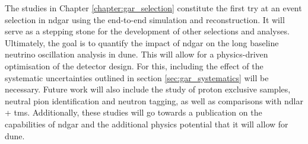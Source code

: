 \begin{comment}
Finally, in Chapter \ref{chapter:gar_selection} I apply to the event selection in \gls{ndgar}. I start by describing a method for selecting $\nu_{\mu}$ \gls{cc} events in section \ref{sec:gar_numu_cc}. This is mainly based on the muon score derived from the muon/pion classification I developed. Additionally, I perform an optimisation of the FV. As part of this study, I also examined the kinematics of the selected primary muon and the reconstructed interaction vertex. Next, in section \ref{sec:gar_charged_pions} I explore the capabilities of \gls{ndgar} and its reconstruction at identifying charged pions. I optimise a selection based on the reconstructed charged pion multiplicity, for events with 0, 1, 2, and $\geq 3 \pi^{\pm}$ in the final state. I the performance of the selection as a function of the truth hadronic invariant mass, as well as the true pion kinematics for the $\nu_{\mu}$ \gls{cc} $1\pi^{\pm}$ case. I briefly discuss the possibility of tagging events with neutral pions by reconstructing the invariant mass of the photon pairs from their decay in section \ref{sec:gar_neutral_pions}. Lastly, in section \ref{sec:gar_energy} I study the neutrino energy reconstruction of the selected $\nu_{\mu}$ \gls{cc} events using a calorimetric approach. For this, I compare the values obtained using generator-level and reconstructed information.

These studies constitute the first try at an event selection in \gls{ndgar} using full simulation and reconstruction. It will serve as a stepping stone for the development of other selections and analyses. Ultimately, the goal is to quantify the impact of \gls{ndgar} on the long baseline analysis in \gls{dune}. For this, including the effect of the systematic uncertainties outlined in section \ref{sec:gar_systematics} will be necessary.
\end{comment}

The studies in Chapter \ref{chapter:gar_selection} constitute the first try at an event selection in \gls{ndgar} using the end-to-end simulation and reconstruction. It will serve as a stepping stone for the development of other selections and analyses. Ultimately, the goal is to quantify the impact of \gls{ndgar} on the long baseline neutrino oscillation analysis in \gls{dune}. This will allow for a physics-driven optimisation of the detector design. For this, including the effect of the systematic uncertainties outlined in section \ref{sec:gar_systematics} will be necessary. Future work will also include the study of proton exclusive samples, neutral pion identification and neutron tagging, as well as comparisons with \gls{ndlar} + \gls{tms}. Additionally, these studies will go towards a publication on the capabilities of \gls{ndgar} and the additional physics potential that it will allow for \gls{dune}.

